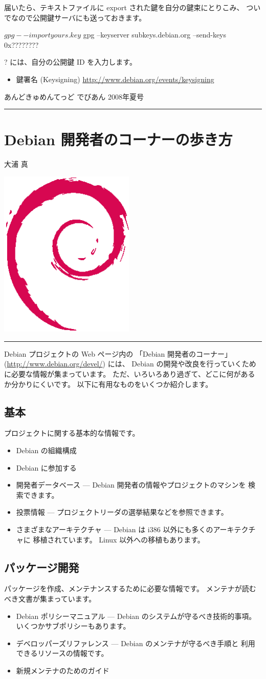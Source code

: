 \documentclass[mingoth,a4paper]{jsarticle}
\renewcommand{\dancersection}[2]{%
\newpage
あんどきゅめんてっど でびあん 2008年夏号
%
\vspace{0.1mm}\\
{\color{dancerlightblue}\rule{\hsize}{2mm}}

%
%
\begin{minipage}[t]{0.6\hsize}
\color{dancerdarkblue}
\vspace{1cm}
\section{#1}
\hfill{}#2\\
\end{minipage}
\begin{minipage}[t]{0.4\hsize}
\vspace{-2cm}
\hfill{}\includegraphics[height=8cm]{image200502/openlogo-nd.eps}\\
\vspace{-5cm}
\end{minipage}
%
%
{\color{dancerdarkblue}\rule{0.74\hsize}{2mm}}
%
\vspace{2cm}
}
\begin{document}
届いたら、テキストファイルに export された鍵を自分の鍵束にとりこみ、
ついでなので公開鍵サーバにも送っておきます。
\begin{commandline}
$ gpg --import yours.key
$ gpg --keyserver subkeys.debian.org --send-keys 0x????????
\end{commandline}

? には、自分の公開鍵 ID を入力します。

\begin{itemize}
 \item 鍵署名 (Keysigning) \url{http://www.debian.org/events/keysigning}
\end{itemize}

\dancersection{Debian 開発者のコーナーの歩き方}{大浦 真}

Debian プロジェクトの Web ページ内の
「Debian 開発者のコーナー」(\url{http://www.debian.org/devel/}) には、
Debian の開発や改良を行っていくために必要な情報が集まっています。
ただ、いろいろあり過ぎて、どこに何があるか分かりにくいです。
以下に有用なものをいくつか紹介します。

\subsection{基本}

プロジェクトに関する基本的な情報です。
\begin{itemize}
\item Debian の組織構成
\item Debian に参加する
\item 開発者データベース --- Debian 開発者の情報やプロジェクトのマシンを
  検索できます。
\item 投票情報 --- プロジェクトリーダの選挙結果などを参照できます。
\item さまざまなアーキテクチャ --- Debian は i386 以外にも多くのアーキテクチャに
  移植されています。
  Linux 以外への移植もあります。
\end{itemize}

\subsection{パッケージ開発}

パッケージを作成、メンテナンスするために必要な情報です。
メンテナが読むべき文書が集まっています。

\begin{itemize}
\item Debian ポリシーマニュアル --- Debian のシステムが守るべき技術的事項。
  いくつかサブポリシーもあります。
\item デベロッパーズリファレンス --- Debian のメンテナが守るべき手順と
  利用できるリソースの情報です。
\item 新規メンテナのためのガイド
\end{itemize}
\end{document}
